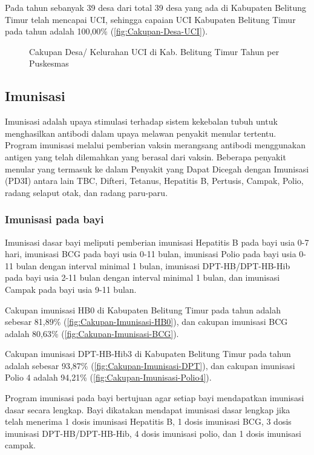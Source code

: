 Pada tahun \tP sebanyak 39 desa dari total 39 desa yang ada di Kabupaten Belitung
Timur telah mencapai UCI, sehingga capaian UCI Kabupaten Belitung
Timur pada tahun \tP adalah 100,00\% (\autoref{fig:Cakupan-Desa-UCI}).

\begin{figure}[H]
    \centering
    \caption{Cakupan Desa/ Kelurahan UCI di Kab. Belitung Timur Tahun \tP per Puskesmas}
    \label{fig:Cakupan-Desa-UCI}
\end{figure}

\subsection{Imunisasi}
Imunisasi adalah upaya stimulasi terhadap sistem kekebalan tubuh untuk
menghasilkan antibodi dalam upaya melawan penyakit menular tertentu.
Program imunisasi melalui pemberian vaksin merangsang antibodi menggunakan
antigen yang telah dilemahkan yang berasal dari vaksin. Beberapa penyakit
menular yang termasuk ke dalam Penyakit yang Dapat Dicegah dengan
Imunisasi (PD3I) antara lain TBC, Difteri, Tetanus, Hepatitis B, Pertusis,
Campak, Polio, radang selaput otak, dan radang paru-paru.

\subsubsection{Imunisasi pada bayi}
Imunisasi dasar bayi meliputi pemberian imunisasi Hepatitis B pada
bayi usia 0-7 hari, imunisasi BCG pada bayi usia 0-11 bulan, imunisasi
Polio pada bayi usia 0-11 bulan dengan interval minimal 1 bulan, imunisasi
DPT-HB/DPT-HB-Hib pada bayi usia 2-11 bulan dengan interval minimal
1 bulan, dan imunisasi Campak pada bayi usia 9-11 bulan.

Cakupan imunisasi HB0 di Kabupaten Belitung Timur pada tahun \tP adalah sebesar 81,89\% (\autoref{fig:Cakupan-Imunisasi-HB0}), dan cakupan imunisasi BCG adalah 80,63\% (\autoref{fig:Cakupan-Imunisasi-BCG}).

Cakupan imunisasi DPT-HB-Hib3 di Kabupaten Belitung Timur pada tahun \tP
adalah sebesar 93,87\% (\autoref{fig:Cakupan-Imunisasi-DPT}), dan cakupan imunisasi Polio 4 adalah 94,21\% (\autoref{fig:Cakupan-Imunisasi-Polio4}).

Program imunisasi pada bayi bertujuan agar setiap bayi mendapatkan
imunisasi dasar secara lengkap. Bayi dikatakan mendapat imunisasi
dasar lengkap jika telah menerima 1 dosis imunisasi Hepatitis B, 1
dosis imunisasi BCG, 3 dosis imunisasi DPT-HB/DPT-HB-Hib, 4 dosis
imunisasi polio, dan 1 dosis imunisasi campak.

